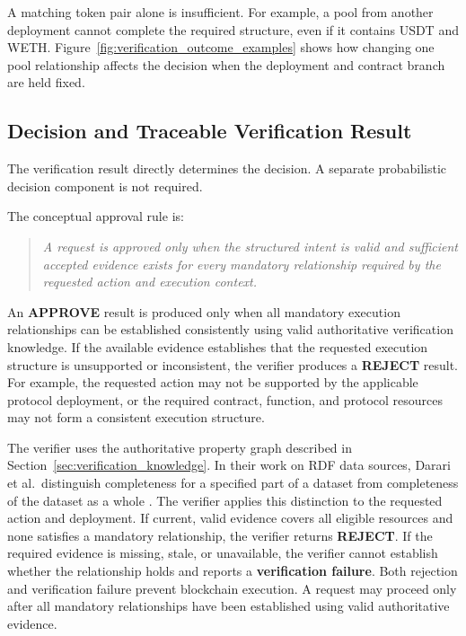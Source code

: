 A matching token pair alone is insufficient. For example, a pool from
another deployment cannot complete the required structure, even if it
contains USDT and WETH. Figure~\ref{fig:verification_outcome_examples}
shows how changing one pool relationship affects the decision when the
deployment and contract branch are held fixed.

\subsection{Decision and Traceable Verification Result}

The verification result directly determines the decision. A separate
probabilistic decision component is not required.

The conceptual approval rule is:

\begin{quote}
\textit{A request is approved only when the structured intent is valid and
sufficient accepted evidence exists for every mandatory relationship required
by the requested action and execution context.}
\end{quote}

An \textbf{APPROVE} result is produced only when all mandatory execution
relationships can be established consistently using valid authoritative
verification knowledge. If the available evidence establishes that the requested execution structure
is unsupported or inconsistent, the verifier produces a \textbf{REJECT}
result. For example, the requested action may not be supported by the
applicable protocol deployment, or the required contract, function, and
protocol resources may not form a consistent execution structure.

The verifier uses the authoritative property graph described in
Section~\ref{sec:verification_knowledge}. In their work on RDF data
sources, Darari et al.\ distinguish completeness for a specified part
of a dataset from completeness of the dataset as a whole
\cite{darari2013completeness}. The verifier applies this distinction
to the requested action and deployment. If current, valid evidence
covers all eligible resources and none satisfies a mandatory
relationship, the verifier returns \textbf{REJECT}. If the required
evidence is missing, stale, or unavailable, the verifier cannot establish
whether the relationship holds and reports a \textbf{verification failure}.
Both rejection and verification failure prevent blockchain execution.
A request may proceed only after all mandatory relationships have been
established using valid authoritative evidence.

